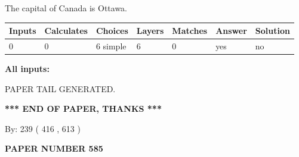 \documentclass[12pt]{article}
\begin{document}
 
The capital of Canada is Ottawa.
 
 
\noindent{}
 
 
   
   
   
   
\noindent\begin{tabular}{|l|l|l|l|l|l|l|}
 \hline
Inputs & Calculates & Choices & Layers & Matches & Answer & Solution \\ \hline
 0  & 
 0  & 
 6
  simple  
  & 
 6  & 
 0  & 
  yes & 
  no 
  \\ \hline
 \end{tabular}
   
   
   
   
\noindent{}
   
   
   
   
\noindent\vspace{0.1in}\hspace{-0.08in} {\textbf{\Large{All inputs: }}}
   
   
   
   
   
   
 \vspace{0.2in}
 
   
   
\vspace{2.0in} PAPER TAIL GENERATED.
   
   
   
   
\vspace{1.0in} 
{\textbf{\large{ *** END OF PAPER, THANKS *** }}} 
   
   
\hspace{1.0in} By: 
 239 ( 416 ,  613 )
   
   
   
   
\newpage 
\setcounter{page}{ 
   585001 } 
   
   
   
   
 {\textbf{ \Large{ PAPER NUMBER  585  }}}
   
   
\vspace{0.2in}
   
   
   
   
   
   
   
\end{document}
